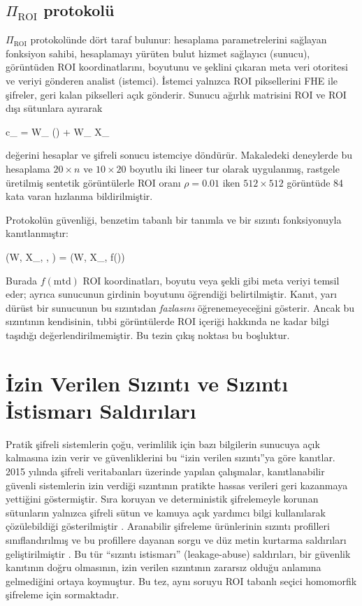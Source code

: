 \subsection{$\Pi_{\mathrm{ROI}}$ protokolü}\label{sec:piroi}

$\Pi_{\mathrm{ROI}}$ protokolünde dört taraf bulunur: hesaplama parametrelerini sağlayan fonksiyon sahibi, hesaplamayı yürüten bulut hizmet sağlayıcı (sunucu), görüntüden ROI koordinatlarını, boyutunu ve şeklini çıkaran meta veri otoritesi ve veriyi gönderen analist (istemci). İstemci yalnızca ROI piksellerini FHE ile şifreler, geri kalan pikselleri açık gönderir. Sunucu ağırlık matrisini ROI ve ROI dışı sütunlara ayırarak

\be
c_{} = W_{} \cdot {}() + W_{} \cdot X_{}
\label{eq:piroi}
\ee

\noindent değerini hesaplar ve şifreli sonucu istemciye döndürür. Makaledeki deneylerde bu hesaplama $20 \times n$ ve $10 \times 20$ boyutlu iki lineer tur olarak uygulanmış, rastgele üretilmiş sentetik görüntülerle ROI oranı $\rho = 0.01$ iken $512 \times 512$ görüntüde 84 kata varan hızlanma bildirilmiştir.

Protokolün güvenliği, benzetim tabanlı bir tanımla ve bir sızıntı fonksiyonuyla kanıtlanmıştır:

\be
{}(W, X_{}, , ) = \left(W,\; X_{},\; f()\right)
\label{eq:leakage}
\ee

\noindent Burada $f(\mathrm{mtd})$ ROI koordinatları, boyutu veya şekli gibi meta veriyi temsil eder; ayrıca sunucunun girdinin boyutunu öğrendiği belirtilmiştir. Kanıt, yarı dürüst bir sunucunun bu sızıntıdan \emph{fazlasını} öğrenemeyeceğini gösterir. Ancak bu sızıntının kendisinin, tıbbi görüntülerde ROI içeriği hakkında ne kadar bilgi taşıdığı değerlendirilmemiştir. Bu tezin çıkış noktası bu boşluktur.

\section{İzin Verilen Sızıntı ve Sızıntı İstismarı Saldırıları}\label{sec:leakageabuse}

Pratik şifreli sistemlerin çoğu, verimlilik için bazı bilgilerin sunucuya açık kalmasına izin verir ve güvenliklerini bu ``izin verilen sızıntı''ya göre kanıtlar. 2015 yılında şifreli veritabanları üzerinde yapılan çalışmalar, kanıtlanabilir güvenli sistemlerin izin verdiği sızıntının pratikte hassas verileri geri kazanmaya yettiğini göstermiştir. Sıra koruyan ve deterministik şifrelemeyle korunan sütunların yalnızca şifreli sütun ve kamuya açık yardımcı bilgi kullanılarak çözülebildiği gösterilmiştir \cite{naveed2015inference}. Aranabilir şifreleme ürünlerinin sızıntı profilleri sınıflandırılmış ve bu profillere dayanan sorgu ve düz metin kurtarma saldırıları geliştirilmiştir \cite{cash2015leakage}. Bu tür ``sızıntı istismarı'' (leakage-abuse) saldırıları, bir güvenlik kanıtının doğru olmasının, izin verilen sızıntının zararsız olduğu anlamına gelmediğini ortaya koymuştur. Bu tez, aynı soruyu ROI tabanlı seçici homomorfik şifreleme için sormaktadır.

